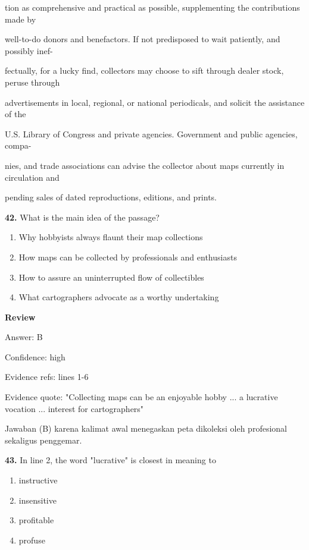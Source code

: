 \documentclass[12pt]{article}
\begin{document}
tion as comprehensive and practical as possible, supplementing the contributions made by\par
well-to-do donors and benefactors. If not predisposed to wait patiently, and possibly inef-\par
fectually, for a lucky find, collectors may choose to sift through dealer stock, peruse through\par
advertisements in local, regional, or national periodicals, and solicit the assistance of the\par
U.S. Library of Congress and private agencies. Government and public agencies, compa-\par
nies, and trade associations can advise the collector about maps currently in circulation and\par
pending sales of dated reproductions, editions, and prints.\par
\endgroup
\medskip
\noindent\textbf{42.} What is the main idea of the passage?
\begin{enumerate}[label=(\Alph*),leftmargin=*,itemsep=0.2em]
\item Why hobbyists always flaunt their map collections
\item How maps can be collected by professionals and enthusiasts
\item How to assure an uninterrupted flow of collectibles
\item What cartographers advocate as a worthy undertaking
\end{enumerate}
\par
\begingroup
\setlength{\parskip}{0pt}
\setlength{\parindent}{0pt}
\textbf{Review}\par
Answer: B\par
Confidence: high\par
Evidence refs: lines 1-6\par
Evidence quote: "Collecting maps can be an enjoyable hobby ... a lucrative vocation ... interest for cartographers"\par
Jawaban (B) karena kalimat awal menegaskan peta dikoleksi oleh profesional sekaligus penggemar.\par
\endgroup
\par
\vspace{0.25\baselineskip}
\noindent\textbf{43.} In line 2, the word "lucrative" is closest in meaning to
\begin{enumerate}[label=(\Alph*),leftmargin=*,itemsep=0.2em]
\item instructive
\item insensitive
\item profitable
\item profuse
\end{enumerate}
\end{document}
